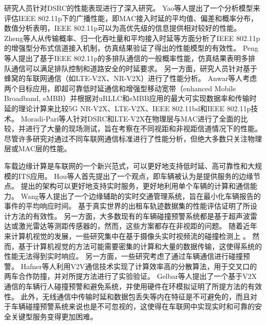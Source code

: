 研究人员针对DSRC的性能表现进行了深入研究。
Yao等人\cite{yao2013delay}提出了一个分析模型来评估IEEE 802.11p下的广播性能，即MAC接入时延的平均值、偏差和概率分布，数值分析表明，IEEE 802.11p可以为高优先级的信息提供相对较好的性能。
Zheng等人\cite{zheng2015performance}从传输概率、归一化吞吐量和平均接入时延等方面分析了IEEE 802.11p的增强型分布式信道接入机制，仿真结果验证了得出的性能模型的有效性。
Peng等人\cite{peng2016performance}提出了基于IEEE 802.11p的多排队通信的一般概率性能，仿真结果表明多排队通信可以满足排队控制和道路安全的时延要求。
另一方面，研究人员针对基于蜂窝的车联网通信（如LTE-V2X、NR-V2X）进行了性能分析。
Anwar等人\cite{anwar2019physical}考虑两个目标应用，即超可靠低时延通信和增强型移动宽带（enhanced Mobile Broadband, eMBB）并根据对uRLLC和eMBB应用的最大可实现数据率和传输时延的理论计算来比较5G NR-V2X、LTE-V2X、IEEE 802.11bd和IEEE 802.11p技术。
Moradi-Pari等人\cite{moradi-pari2023dsrc}针对DSRC和LTE-V2X在物理层与MAC进行了全面的比较，并进行了大量的现场测试，旨在考察在不同视距和非视距信道情况下的性能。
尽管许多研究对通过不同车联网通信标准进行了性能分析，但绝大多数只关注物理层或MAC层的性能。

车载边缘计算是车联网的一个新兴范式，可以更好地支持低时延、高可靠性和大规模的ITS应用。
Hou等人\cite{hou2016vehicular}首先提出了一个观点，即车辆被认为是提供服务的边缘节点。
提出的架构可以更好地支持实时服务，更好地利用单个车辆的计算和通信能力。
Wang等人\cite{wang2018offloading}提出了一个边缘辅助的实时交通管理系统，旨在最小化车辆报告的事件的平均响应时间。
基于真实世界的出租车轨迹数据集的性能评估证明了所设计方法的有效性。
另一方面，大多数现有的车辆碰撞预警系统都是基于超声波雷达或激光雷达等测距传感器的\cite{song2018real, wu2019series}，然而，这些方案都存在非视距的问题。
随着近年来计算机视觉的发展，一些研究集中在基于摄像头实时视频流的碰撞检测上 \cite{wang2016vision, song2018lane}。
然而，基于计算机视觉的方法可能需要密集的计算和大量的数据传输，这使得系统的性能无法得到实时响应。 
另一方面，一些研究考虑了通过车辆通信进行碰撞预警。
Hafner等人\cite{hafner2013cooperative}利用V2V通信技术实现了计算效率高的分散算法，用于交叉口的两车合作防撞，并对所提方法进行了实验验证。
Gelbar等人\cite{gelbal2017elastic}提出了一个基于V2X通信的车辆行人碰撞预警和避免系统，并使用硬件在环模拟证明了所提方法的有效性。
此外，无线通信中传输时延和数据包丢失等内在特征是不可避免的，而且对于车辆碰撞预警系统来说也是不可忽视的，这使得在车联网中实现实时和可靠的安全关键型服务变得更加困难。

